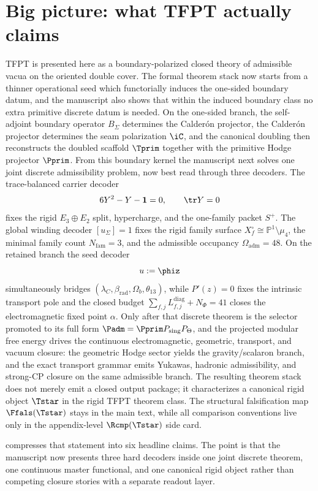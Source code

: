 \section{Big picture: what TFPT actually claims}

TFPT is presented here as a boundary-polarized closed theory of admissible vacua on the oriented
double cover. The formal theorem stack now starts from a thinner operational seed which functorially
induces the one-sided boundary datum, and the manuscript also shows that within the induced
boundary class no extra primitive discrete datum is needed. On the
one-sided branch, the self-adjoint boundary operator $B_\Sigma$ determines the Calder\'on projector,
the Calder\'on projector determines the seam polarization
$\iC$, and the canonical doubling then reconstructs the doubled scaffold $\Tprim$ together with
the primitive Hodge projector $\Pprim$. From this boundary kernel the manuscript next solves one
joint discrete admissibility problem, now best read through three decoders. The trace-balanced
carrier decoder
\[
6Y^2-Y-\mathbf 1=0,
\qquad
\tr Y=0
\]
fixes the rigid $E_3\oplus E_2$ split, hypercharge, and the one-family packet $S^+$. The global
winding decoder $[u_\Sigma]=1$ fixes the rigid family surface $X_f^\circ\cong\mathbb P^1\setminus
\mu_4$, the minimal family count $N_{\mathrm{fam}}=3$, and the admissible occupancy
$\Omega_{\mathrm{adm}}=48$. On the retained branch the seed decoder
\[
u:=\phiz
\]
simultaneously bridges $(\lambda_C,\beta_{\mathrm{rad}},\Omega_b,\theta_{13})$, while
$P'(z)=0$ fixes the intrinsic transport pole and the closed budget
$\sum_{f,j}L_{f,j}^{\mathrm{diag}}+N_\Phi=41$ closes the electromagnetic fixed point $\alpha$.
Only after that discrete theorem is the selector promoted to its full form
$\Padm=\Pprim P_{\mathrm{sing}}P_{\Theta}$, and the projected modular free energy drives the
continuous electromagnetic, geometric, transport, and vacuum closure: the geometric Hodge sector
yields the gravity/scalaron branch, and the exact transport grammar emits Yukawas, hadronic
admissibility, and strong-CP closure on the same admissible branch. The resulting theorem stack
does not merely emit a closed output package; it characterizes a canonical rigid object $\Tstar$ in
the rigid TFPT theorem class. The structural falsification map $\Ffals(\Tstar)$ stays in the main
text, while all comparison conventions live only in the appendix-level $\Rcmp(\Tstar)$ side card.

 compresses that statement into six headline claims. The point is
that the manuscript now presents three hard decoders inside one joint discrete theorem, one
continuous master functional, and one canonical rigid object rather than competing closure stories
with a separate readout layer.

